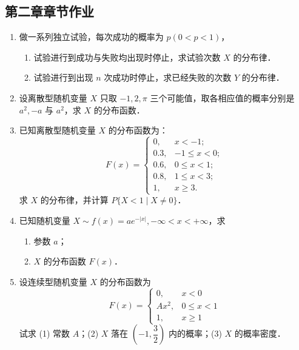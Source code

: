 \subsection{第二章章节作业}
\begin{enumerate}
	\item 做一系列独立试验，每次成功的概率为 $p(0 < p < 1)$，
	\begin{enumerate}
		\item 试验进行到成功与失败均出现时停止，求试验次数 $X$ 的分布律．
		\item 试验进行到出现 $n$ 次成功时停止，求已经失败的次数 $Y$ 的分布律．
	\end{enumerate}
	
	\vspace{5cm}
	
	\item 设离散型随机变量 $X$ 只取 $-1, 2, \pi$ 三个可能值，取各相应值的概率分别是 $a^2, -a$ 与 $a^2$，求 $X$ 的分布函数．
	
	\vspace{5cm}
	
	\item 已知离散型随机变量 $X$ 的分布函数为：
	\[
	F(x) = \begin{cases}
		0, & x < -1; \\
		0.3, & -1 \le x < 0; \\
		0.6, & 0 \le x < 1; \\
		0.8, & 1 \le x < 3; \\
		1, & x \ge 3.
	\end{cases}
	\]
	求 $X$ 的分布律，并计算 $P\{X < 1 \mid X \ne 0\}$．
	
	\vspace{5cm}
	
	\item 已知随机变量 $X \sim f(x) = a e^{-|x|}, -\infty < x < +\infty$，求
	\begin{enumerate}
		\item 参数 $a$；
		\item $X$ 的分布函数 $F(x)$．
	\end{enumerate}
	
	\vspace{5cm}
	
	\item 设连续型随机变量 $X$ 的分布函数为
	\[
	F(x) = \begin{cases}
		0, & x < 0 \\
		A x^2, & 0 \le x < 1 \\
		1, & x \ge 1
	\end{cases}
	\]
	试求 (1) 常数 $A$；(2) $X$ 落在 $\left(-1, \dfrac{3}{2}\right)$ 内的概率；(3) $X$ 的概率密度．
	

\end{enumerate}
